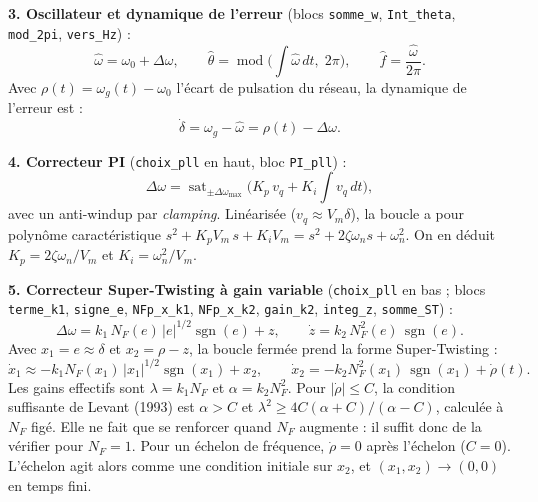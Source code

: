 \documentclass[10pt,a4paper]{article}
\newcommand{\sgn}{\operatorname{sgn}}
\newcommand{\sat}{\operatorname{sat}}
\begin{document}
\textbf{3. Oscillateur et dynamique de l'erreur} (blocs \texttt{somme\_w}, \texttt{Int\_theta}, \texttt{mod\_2pi}, \texttt{vers\_Hz}) :
\begin{equation}
\hat\omega=\omega_0+\Delta\omega,\qquad
\hat\theta=\operatorname{mod}\!\Big(\int\hat\omega\,dt,\;2\pi\Big),\qquad
\hat f=\frac{\hat\omega}{2\pi}.
\end{equation}
Avec $\rho(t)=\omega_g(t)-\omega_0$ l'écart de pulsation du réseau, la dynamique de l'erreur est :
\begin{equation}
\dot\delta=\omega_g-\hat\omega=\rho(t)-\Delta\omega .
\end{equation}

\textbf{4. Correcteur PI} (\texttt{choix\_pll} en haut, bloc \texttt{PI\_pll}) :
\begin{equation}
\Delta\omega=\sat_{\pm\Delta\omega_{\max}}\!\Big(K_p\,v_q+K_i\!\int v_q\,dt\Big),
\end{equation}
avec un anti-windup par \emph{clamping}. Linéarisée ($v_q\approx V_m\delta$), la boucle a pour polynôme caractéristique $s^2+K_pV_m\,s+K_iV_m=s^2+2\zeta\omega_n s+\omega_n^2$. On en déduit $K_p=2\zeta\omega_n/V_m$ et $K_i=\omega_n^2/V_m$.

\textbf{5. Correcteur Super-Twisting à gain variable} (\texttt{choix\_pll} en bas ; blocs \texttt{terme\_k1}, \texttt{signe\_e}, \texttt{NFp\_x\_k1}, \texttt{NFp\_x\_k2}, \texttt{gain\_k2}, \texttt{integ\_z}, \texttt{somme\_ST}) :
\begin{equation}
\Delta\omega=k_1\,N_F(e)\,|e|^{1/2}\sgn(e)+z,\qquad
\dot z=k_2\,N_F^2(e)\,\sgn(e).
\end{equation}
Avec $x_1=e\approx\delta$ et $x_2=\rho-z$, la boucle fermée prend la forme Super-Twisting :
\begin{equation}
\dot x_1\approx-k_1N_F(x_1)\,|x_1|^{1/2}\sgn(x_1)+x_2,\qquad
\dot x_2=-k_2N_F^2(x_1)\,\sgn(x_1)+\dot\rho(t).
\end{equation}
Les gains effectifs sont $\lambda=k_1N_F$ et $\alpha=k_2N_F^2$. Pour $|\dot\rho|\le C$, la condition suffisante de Levant (1993) est $\alpha>C$ et $\lambda^2\ge 4C(\alpha+C)/(\alpha-C)$, calculée à $N_F$ figé. Elle ne fait que se renforcer quand $N_F$ augmente : il suffit donc de la vérifier pour $N_F=1$. Pour un échelon de fréquence, $\dot\rho=0$ après l'échelon ($C=0$). L'échelon agit alors comme une condition initiale sur $x_2$, et $(x_1,x_2)\to(0,0)$ en temps fini.
\end{document}
